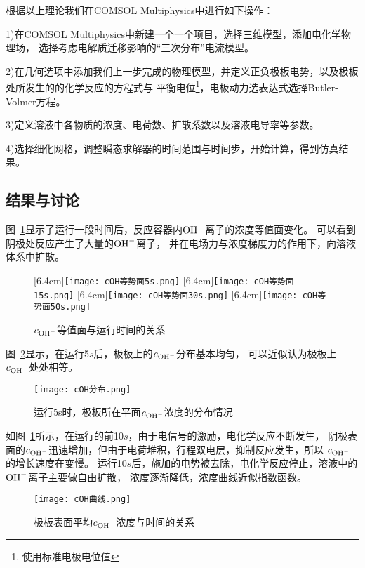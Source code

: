 根据以上理论我们在COMSOL Multiphysics中进行如下操作：

1)在COMSOL Multiphysics中新建一个一个项目，选择三维模型，添加电化学物理场，
选择考虑电解质迁移影响的“三次分布”电流模型。

2)在几何选项中添加我们上一步完成的物理模型，并定义正负极板电势，以及极板处所发生的的化学反应的方程式与
平衡电位\footnote{使用标准电极电位值}，电极动力选表达式选择Butler-Volmer方程。

3)定义溶液中各物质的浓度、电荷数、扩散系数以及溶液电导率等参数。

4)选择细化网格，调整瞬态求解器的时间范围与时间步，开始计算，得到仿真结果。

\subsection{结果与讨论}
图~\ref{fig:cOH1}显示了运行一段时间后，反应容器内$\ce{OH-}$离子的浓度等值面变化。
可以看到阴极处反应产生了大量的$\ce{OH-}$离子，
并在电场力与浓度梯度力的作用下，向溶液体系中扩散。
\begin{figure}[ht]
    \centering
                    [6.4cm]{\texttt{[image: cOH等势面5s.png]}}
    \hspace{1cm}
                    [6.4cm]{\texttt{[image: cOH等势面15s.png]}}
    \centering
                    [6.4cm]{\texttt{[image: cOH等势面30s.png]}}
    \hspace{1cm}
                    [6.4cm]{\texttt{[image: cOH等势面50s.png]}}
    \caption{$c_{\ce{OH-}}$等值面与运行时间的关系}
    \label{fig:cOH1}
\end{figure}

图~\ref{fig:cOH_distribution}显示，在运行5$s$后，极板上的$c_{\ce{OH-}}$分布基本均匀，
可以近似认为极板上$c_{\ce{OH-}}$处处相等。
\begin{figure}[H]
    \centering
    \texttt{[image: cOH分布.png]}
    \caption{运行5s时，极板所在平面$c_{\ce{OH-}}$浓度的分布情况}
    \label{fig:cOH_distribution}
\end{figure}

如图~\ref{fig:cOH1}所示，在运行的前10$s$，由于电信号的激励，电化学反应不断发生，
阴极表面的$c_{\ce{OH-}}$迅速增加，但由于电荷堆积，行程双电层，抑制反应发生，所以
$c_{\ce{OH-}}$的增长速度在变慢。
运行10$s$后，施加的电势被去除，电化学反应停止，溶液中的${\ce{OH-}}$离子主要做自由扩散，
浓度逐渐降低，浓度曲线近似指数函数。
\begin{figure}[H]
    \centering
    \texttt{[image: cOH曲线.png]}
    \caption{极板表面平均$c_{\ce{OH-}}$浓度与时间的关系}
    \label{fig:cOH_t}
\end{figure}

